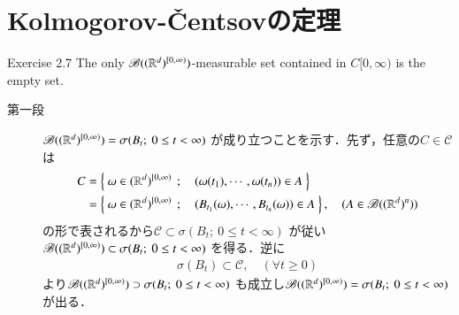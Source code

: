 \section{Kolmogorov-\v{C}entsovの定理}
	\begin{itembox}[l]{Exercise 2.7}
		The only $\mathscr{B}((\mathbb{R}^d)^{[0,\infty)})$-measurable set contained 
		in $C[0,\infty)$ is the empty set.
	\end{itembox}
	
	\begin{prf}\mbox{}
		\begin{description}
			\item[第一段]
				$\borel{(\R^d)^{[0,\infty)}} = \sigma(B_t;\ 0 \leq t < \infty)$
				が成り立つことを示す．先ず，任意の$C \in \mathscr{C}$は
				\begin{align}
					C &= \left\{\ \omega \in (\mathbb{R}^d)^{[0,\infty)}\ \, ; \quad (\omega(t_1),\cdots,\omega(t_n)) \in A\ \right\} \\
					&=  \left\{\ \omega \in (\mathbb{R}^d)^{[0,\infty)}\ \, ; \quad (B_{t_1}(\omega),\cdots,B_{t_n}(\omega)) \in A\ \right\},
					\quad (A \in \mathscr{B}((\mathbb{R}^d)^n))
				\end{align}
				の形で表されるから$\mathscr{C} \subset \sigma(B_t;\ 0 \leq t < \infty)$
				が従い$\mathscr{B}((\mathbb{R}^d)^{[0,\infty)}) \subset \sigma(B_t;\ 0 \leq t < \infty)$
				を得る．逆に
				\begin{align}
					\sigma(B_t) \subset \mathscr{C},
					\quad (\forall t \geq 0)
				\end{align}
				より$\mathscr{B}((\mathbb{R}^d)^{[0,\infty)}) \supset \sigma(B_t;\ 0 \leq t < \infty)$
				も成立し$\borel{(\R^d)^{[0,\infty)}} = \sigma(B_t;\ 0 \leq t < \infty)$
				が出る．
				

\end{description}
\end{prf}
